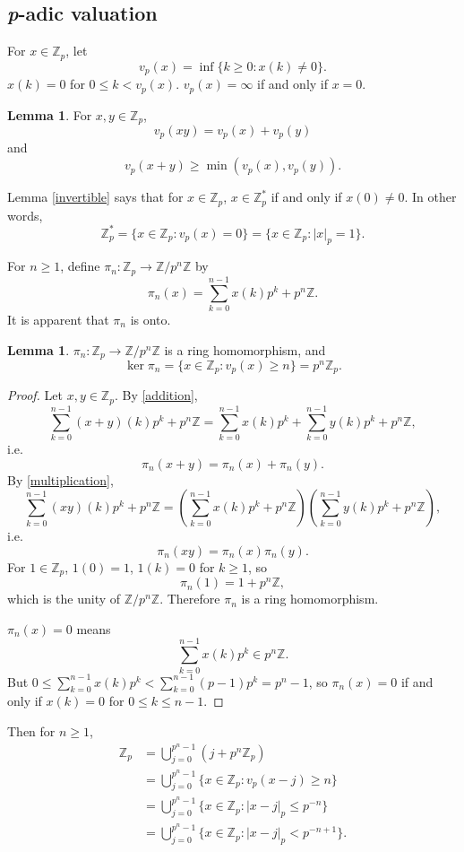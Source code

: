 \documentclass{article}
\theoremstyle{definition}
\newtheorem{lemma}[theorem]{Lemma}
\theoremstyle{definition}
\begin{document}
\subsection{{\em p}-adic valuation}
For $x \in \mathbb{Z}_p$, let
\[
v_p(x) = \inf\{k \geq 0: x(k) \neq 0\}. 
\]
$x(k)=0$ for $0 \leq k < v_p(x)$. $v_p(x) = \infty$ if and only if $x=0$.

\begin{lemma}
For $x,y \in \mathbb{Z}_p$, 
\[
v_p(xy) = v_p(x)+v_p(y)
\]
and
\[
v_p(x+y) \geq \min(v_p(x),v_p(y)).
\]
\end{lemma}

Lemma \ref{invertible} says that for $x \in \mathbb{Z}_p$, $x \in \mathbb{Z}_p^*$ if and only if $x(0) \neq 0$.
In other words, 
\[
\mathbb{Z}_p^* = \{x \in \mathbb{Z}_p : v_p(x) = 0\} = \{x \in \mathbb{Z}_p : |x|_p = 1\}.
\]

For $n \geq 1$,
define $\pi_n:\mathbb{Z}_p \to \mathbb{Z}/p^n \mathbb{Z}$ by
\[
\pi_n(x) = \sum_{k=0}^{n-1} x(k) p^k + p^n \mathbb{Z}.
\]
It is apparent that $\pi_n$ is onto.

\begin{lemma}
$\pi_n:\mathbb{Z}_p \to \mathbb{Z}/p^n \mathbb{Z}$ is a ring homomorphism,
and
\[
\ker \pi_n = \{x \in \mathbb{Z}_p : v_p(x) \geq n\} = p^n \mathbb{Z}_p.
\]
\end{lemma}
\begin{proof}
Let $x,y \in \mathbb{Z}_p$. By \eqref{addition},
\[
\sum_{k=0}^{n-1} (x+y)(k) p^k + p^n \mathbb{Z} = \sum_{k=0}^{n-1} x(k) p^k + \sum_{k=0}^{n-1} y(k) p^k + p^n \mathbb{Z},
\]
i.e.
\[
\pi_n(x+y) = \pi_n(x)+\pi_n(y).
\]
By \eqref{multiplication},
\[
\sum_{k=0}^{n-1} (xy)(k) p^k + p^n \mathbb{Z} = \left(\sum_{k=0}^{n-1} x(k) p^k + p^n\mathbb{Z} \right)
 \left(\sum_{k=0}^{n-1} y(k) p^k + p^n\mathbb{Z} \right),
\]
i.e.
\[
\pi_n(xy) = \pi_n(x) \pi_n(y).
\]
For $1 \in \mathbb{Z}_p$, $1(0)=1$, $1(k)=0$ for $k \geq 1$, so 
\[
\pi_n(1) = 1 + p^n\mathbb{Z},
\]
which is the unity of $\mathbb{Z}/p^n \mathbb{Z}$. Therefore $\pi_n$ is a ring homomorphism.

$\pi_n(x)=0$ means
\[
\sum_{k=0}^{n-1} x(k) p^k \in p^n \mathbb{Z}.
\]
But $0 \leq \sum_{k=0}^{n-1} x(k) p^k < \sum_{k=0}^{n-1} (p-1) p^k = p^n-1$, so $\pi_n(x)=0$ if and only if 
$x(k)=0$ for $0 \leq k \leq n-1$. 
\end{proof}

Then for $n \geq 1$,
\begin{align*}
\mathbb{Z}_p &= \bigcup_{j=0}^{p^n-1} (j+p^n \mathbb{Z}_p)\\
&=\bigcup_{j=0}^{p^n-1} \{x \in \mathbb{Z}_p: v_p(x-j) \geq n\}\\
&=\bigcup_{j=0}^{p^n-1} \{x \in \mathbb{Z}_p: |x-j|_p \leq p^{-n}\}\\
&=\bigcup_{j=0}^{p^n-1} \{x \in \mathbb{Z}_p: |x-j|_p < p^{-n+1}\}.
\end{align*}
\end{document}
